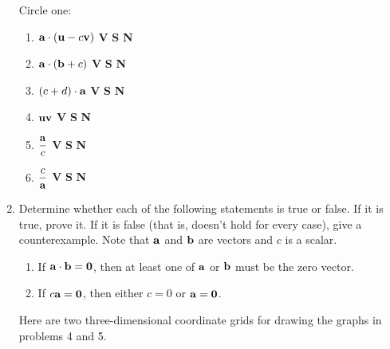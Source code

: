 \documentclass[12pt]{article}
\newcommand{\vb}{\bf}
\begin{document}
\begin{enumerate}
\hfill                                  Circle one: \hspace*{.2in}
 \begin{enumerate}
        \item ${\vb a} \cdot ({\vb u} - c{\vb v})$
                \hfill \textbf{V} \qquad \textbf{S} \qquad \textbf{N}
        \medskip
        \item ${\vb a} \cdot ({\vb b} + c)$
                \hfill \textbf{V} \qquad \textbf{S} \qquad \textbf{N}
        \medskip
        \item $(c + d) \cdot {\vb a}$
                \hfill \textbf{V} \qquad \textbf{S} \qquad \textbf{N}
        \medskip
        \item ${\vb u} {\vb v}$
                \hfill \textbf{V} \qquad \textbf{S} \qquad \textbf{N}
        \medskip
        \item $\displaystyle{\frac{{\vb a}}{c}}$
                \hfill \textbf{V} \qquad \textbf{S} \qquad \textbf{N}
        \medskip
        \item $\displaystyle{\frac{c}{{\vb a}}}$
                \hfill \textbf{V} \qquad \textbf{S} \qquad \textbf{N}
 \end{enumerate}
\vfill\eject
\item Determine whether each of the following statements is true or false. If it is true, prove it.
If it is false (that is, doesn't
hold for every case), give a counterexample.  Note that ${\vb a}$ and
${\vb b}$ are vectors and $c$ is a scalar.
   \begin{enumerate}
        \item If ${\vb a} \cdot {\vb b} = {\vb 0}$, then at least one of
                ${\vb a}$ or ${\vb b}$ must be the zero vector.
        \item If $c{\vb a} = {\vb 0}$, then
                either $c = 0$ or  ${\vb a} = {\vb 0}$.
   \end{enumerate}

\bigskip
\bigskip
Here are two three-dimensional coordinate grids for drawing the graphs
in problems 4 and 5.

\bigskip


\end{enumerate}
\end{document}
